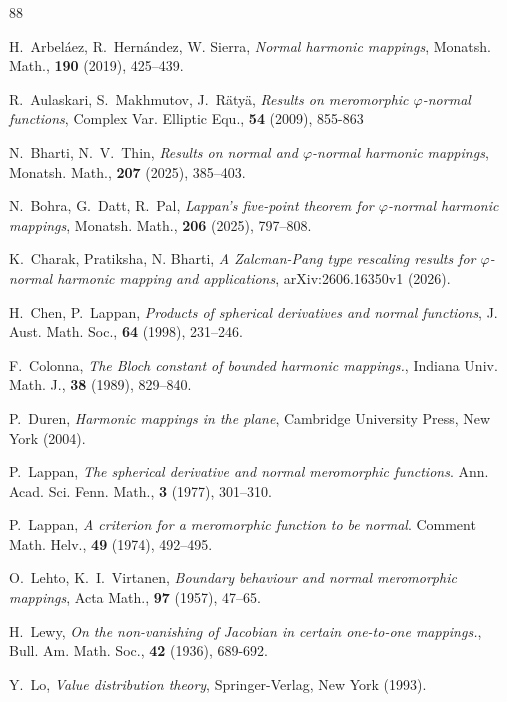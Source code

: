 \documentclass[11pt, reqno]{amsart}
\numberwithin{equation}{section}
\theoremstyle{definition}
\theoremstyle{remark}
\theoremstyle{plain}
\begin{document}
\begin{thebibliography}{88}

H.~Arbel\'aez, R.~Hern\'andez, W. Sierra,
\textit{Normal harmonic mappings}, Monatsh. Math., {\bf 190} (2019), 425--439.\smallskip

R.~Aulaskari, S.~Makhmutov, J.~R\"aty\"a,
\textit{Results on meromorphic $\varphi$-normal functions},
Complex Var. Elliptic Equ., {\bf 54} (2009), 855-863
\smallskip

N.~Bharti, N.~V.~Thin,
{\it Results on normal and $\varphi$-normal harmonic mappings},
Monatsh. Math., {\bf 207} (2025), 
385--403.\smallskip

N.~Bohra, G.~Datt, R.~Pal, \textit{Lappan's five-point
theorem for $\varphi$-normal harmonic mappings}, Monatsh. Math., {\bf206} (2025), 797--808.\smallskip

K.~Charak, Pratiksha, N. Bharti, \textit{A Zalcman-Pang type rescaling 
results for $\varphi$-normal harmonic mapping and applications}, 	arXiv:2606.16350v1 (2026).\smallskip
 
 H.~Chen, P.~Lappan, {\it Products of spherical derivatives and normal 
 functions}, J. Aust. Math. Soc., {\bf 64} (1998), 
 231--246.\smallskip
 
F.~Colonna,
\textit{The Bloch constant of bounded harmonic mappings.},
Indiana Univ. Math. J., {\bf 38} (1989), 
829--840.\smallskip

P.~Duren, {\it Harmonic mappings in the plane},
Cambridge University Press, New York (2004).\smallskip

P.~Lappan, \textit{The spherical derivative and normal meromorphic
functions}. Ann. Acad. Sci. Fenn. Math., {\bf 3} (1977), 301--310.

P.~Lappan, \textit{A criterion for a meromorphic function to 
be normal}. Comment Math. Helv., {\bf 49} (1974), 492--495.\smallskip

O.~Lehto, K.~I.~Virtanen,
\textit{Boundary behaviour and normal meromorphic mappings},
Acta Math., \textbf{97} (1957), 47--65.\smallskip

H.~Lewy, \textit{On the non-vanishing of Jacobian in certain 
one-to-one mappings.}, Bull. Am. Math. Soc.,
{\bf 42} (1936), 689-692.\smallskip

Y.~Lo,
\textit{Value distribution theory}, Springer-Verlag, New York (1993).\smallskip


\end{thebibliography}
\end{document}
